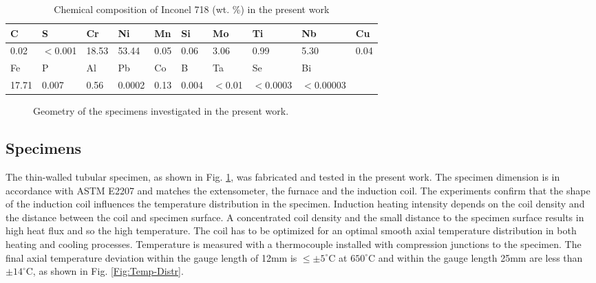 \documentclass[preprint,5p,twocolumn,11pt,sort&compress]{elsarticle}
\newcommand{\marked}[1]{\textcolor{red}{#1}}
\begin{document}
\begin{table*}[htbp]
  \centering
  \caption{Chemical composition of Inconel 718 (wt. \%) in the present work}\vspace{0.1cm}
    \begin{tabular}{llllllllll}
    \hline
    C     & S     & Cr    & Ni    & Mn    & Si    & Mo    & Ti    & Nb    & Cu \\
    \hline
    0.02  & $<$0.001 & 18.53 & 53.44 & 0.05  & 0.06  & 3.06  & 0.99  & 5.30  & 0.04 \\
    \hline
    Fe    & P     & Al    & Pb    & Co    & B     & Ta    & Se    & Bi    &  \\
    \hline
    17.71 & 0.007 & 0.56  & 0.0002 & 0.13  & 0.004 & $<$0.01 & $<$0.0003 & $<$0.00003 &  \\
    \hline
    \end{tabular}%
  \label{Tab:ChemicalCompositionofIN718}%
\end{table*}%

\begin{figure}[htp]
\caption{Geometry of the specimens investigated in the present work.}
\label{Fig:Specimen}
\end{figure}

\subsection{Specimens}
The thin-walled tubular specimen, as shown in Fig. \ref{Fig:Specimen}, was fabricated and tested in the present work. The specimen dimension is in accordance with ASTM E2207 \cite{ASTM2014} and matches the extensometer, the furnace and the induction coil. The experiments confirm that 
the shape of the induction coil influences the temperature distribution in the specimen. Induction heating intensity depends on the coil density and the distance between the coil and specimen surface. A concentrated coil density and the small distance to the specimen surface results in high heat flux and so the high temperature. The coil has to be optimized for an optimal smooth axial temperature distribution in both heating and cooling processes. Temperature is measured with a thermocouple installed with compression junctions to the specimen. The final axial temperature deviation within the gauge length of 12mm is $\le \pm5^\circ$C at $650^\circ$C and within the gauge length 25mm are less than $\pm14^\circ$C, as shown in Fig. \ref{Fig:Temp-Distr}.
\end{document}
